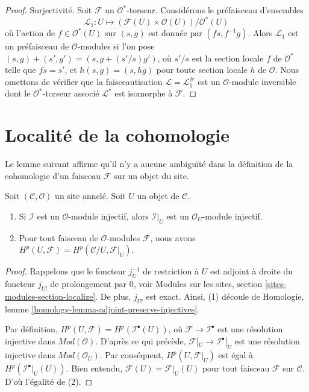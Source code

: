 \begin{proof}
\medskip\noindent
Surjectivité. Soit $\mathcal{F}$ un $\mathcal{O}^*$-torseur.
Considérons le préfaisceau d'ensembles
$$
\mathcal{L}_1 : U \longmapsto
(\mathcal{F}(U) \times \mathcal{O}(U))/\mathcal{O}^*(U)
$$
où l'action de $f \in \mathcal{O}^*(U)$ sur
$(s, g)$ est donnée par $(fs, f^{-1}g)$. Alors $\mathcal{L}_1$ est un préfaisceau
de $\mathcal{O}$-modules si l'on pose
$(s, g) + (s', g') = (s, g + (s'/s)g')$, où $s'/s$ est la section locale
$f$ de $\mathcal{O}^*$ telle que $fs = s'$, et
$h(s, g) = (s, hg)$ pour toute section locale $h$ de $\mathcal{O}$.
Nous omettons de vérifier que la faisceautisation
$\mathcal{L} = \mathcal{L}_1^\#$ est un $\mathcal{O}$-module inversible
dont le $\mathcal{O}^*$-torseur associé $\mathcal{L}^*$ est isomorphe
à $\mathcal{F}$.
\end{proof}









\section{Localité de la cohomologie}
\label{section-locality}

\noindent
Le lemme suivant affirme qu'il n'y a aucune ambiguïté dans la définition de la cohomologie
d'un faisceau $\mathcal{F}$ sur un objet du site.

\begin{lemma}
\label{lemma-cohomology-of-open}
Soit $(\mathcal{C}, \mathcal{O})$ un site annelé.
Soit $U$ un objet de $\mathcal{C}$.
\begin{enumerate}
\item Si $\mathcal{I}$ est un $\mathcal{O}$-module injectif,
alors $\mathcal{I}|_U$ est un $\mathcal{O}_U$-module injectif.
\item Pour tout faisceau de $\mathcal{O}$-modules $\mathcal{F}$, nous avons
$H^p(U, \mathcal{F}) = H^p(\mathcal{C}/U, \mathcal{F}|_U)$.
\end{enumerate}
\end{lemma}

\begin{proof}
Rappelons que le foncteur $j_U^{-1}$ de restriction à $U$ est adjoint à droite
du foncteur $j_{U!}$ de prolongement par $0$, voir
Modules sur les sites, section
\ref{sites-modules-section-localize}.
De plus, $j_{U!}$ est exact. Ainsi, (1) découle de
Homologie, lemme \ref{homology-lemma-adjoint-preserve-injectives}.

\medskip\noindent
Par définition, $H^p(U, \mathcal{F}) = H^p(\mathcal{I}^\bullet(U))$,
où $\mathcal{F} \to \mathcal{I}^\bullet$ est une résolution injective
dans $\textit{Mod}(\mathcal{O})$.
D'après ce qui précède, $\mathcal{F}|_U \to \mathcal{I}^\bullet|_U$
est une résolution injective dans $\textit{Mod}(\mathcal{O}_U)$.
Par conséquent, $H^p(U, \mathcal{F}|_U)$ est égal à
$H^p(\mathcal{I}^\bullet|_U(U))$.
Bien entendu, $\mathcal{F}(U) = \mathcal{F}|_U(U)$ pour
tout faisceau $\mathcal{F}$ sur $\mathcal{C}$.
D'où l'égalité de (2).
\end{proof}

